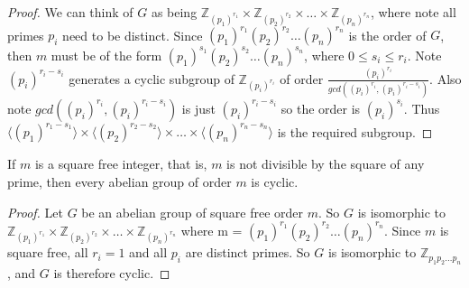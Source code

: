 \documentclass[a4paper,11pt]{article}
\begin{document}
\begin{outline}
    \begin{proof}
      We can think of \(G\) as being \(\mathbb{Z}_{(p_{1})^{r_{1}}} \times \mathbb{Z}_{(p_{2})^{r_{2}}} \times 
      \ldots \times \mathbb{Z}_{(p_{n})^{r_{n}}}\), where note all primes \(p_{i}\) need to be distinct. Since
      \((p_{1})^{r_{1}} (p_{2})^{r_{2}} \ldots (p_{n})^{r_{n}}\) is the order of \(G\), then \(m\) must be of the
      form \((p_{1})^{s_{1}} (p_{2})^{s_{2}} \ldots (p_{n})^{s_{n}}\), where \(0 \leq s_{i} \leq r_{i}\). Note
      \((p_{i})^{r_{i}-s_{i}}\) generates a cyclic subgroup of \(\mathbb{Z}_{(p_{i})^{r_{i}}}\) of order
      \(\frac{(p_{i})^{r_{i}}}{gcd((p_{i})^{r_{i}}, (p_{i})^{r_{i}-s_{i}})}\). Also note 
      \(gcd((p_{i})^{r_{i}}, (p_{i})^{r_{i}-s_{i}})\) is just \((p_{i})^{r_{i}-s_{i}}\) so the order is 
      \((p_{i})^{s_{i}}\). Thus \(\langle (p_{1})^{r_{1}-s_{1}} \rangle \times \langle (p_{2})^{r_{2}-s_{2}} 
      \rangle \times \ldots \times \langle (p_{n})^{r_{n}-s_{n}} \rangle\) is the required subgroup.
    \end{proof}
    
    If \(m\) is a square free integer, that is, \(m\) is not divisible by the square of 
    any prime, then every abelian group of order \(m\) is cyclic.
    
    \begin{proof}
      Let \(G\) be an abelian group of square free order \(m\). So \(G\) is isomorphic to 
      \(\mathbb{Z}_{(p_{1})^{r_{1}}} \times \mathbb{Z}_{(p_{2})^{r_{2}}} \times \ldots \times 
      \mathbb{Z}_{(p_{n})^{r_{n}}}\) where m = \((p_{1})^{r_{1}} (p_{2})^{r_{2}} \ldots (p_{n})^{r_{n}}\).
      Since \(m\) is square free, all \(r_{i} = 1\) and all \(p_{i}\) are distinct primes. So \(G\) is
      isomorphic to \(\mathbb{Z}_{p_{1} p_{2} \ldots p_{n}}\), and \(G\) is therefore cyclic.
    \end{proof}

\end{outline}
\end{document}
